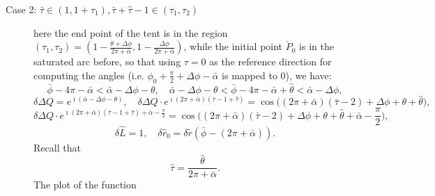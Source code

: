 \documentclass[reqno]{amsart}
\theoremstyle{definition} \newtheorem{definition}{Definition}[section]
\theoremstyle{definition} \newtheorem{remark}[definition]{Remark}
\theoremstyle{plain} \newtheorem{lemma}[definition]{Lemma}
\theoremstyle{plain} \newtheorem{proposition}[definition]{Proposition}
\theoremstyle{plain} \newtheorem{theorem}[definition]{Theorem}
\theoremstyle{plain} \newtheorem{corollary}[definition]{Corollary}
\theoremstyle{definition} \newtheorem{example}[definition]{Example}
\theoremstyle{plain} \newtheorem{claim}[clai]{Claim}
\theoremstyle{definition} \newtheorem{assumption}[definition]{Assumption}
\theoremstyle{definition} \newtheorem{observation}[definition]{Observation}
\newcommand{\1}{\mathbbm 1}
\renewcommand{\i}{\imath}
\numberwithin{equation}{section} %
\theoremstyle{plain} \newtheorem*{theorem*}{Theorem}
\theoremstyle{plain} \newtheorem{mthm}[maintheorem]{Main Theorem}
\theoremstyle{plain} \newtheorem*{mthm*}{Main Theorem}
\theoremstyle{plain} \newtheorem*{conjecture*}{Conjecture}
\theoremstyle{plain} \newtheorem{conjecture}[definition]{Conjecture}
\theoremstyle{plain} \newtheorem*{problem*}{Problem}
\begin{document}
\begin{description}

\item[Case 2: $\bar \tau \in (1,1+\tau_1), \bar \tau + \hat \tau - 1 \in (\tau_1,\tau_2)$] here the end point of the tent is in the region $(\tau_1,\tau_2) = (1 - \frac{\theta + \Delta \phi}{2\pi + \bar \alpha},1 - \frac{\Delta \phi}{2\pi + \bar \alpha})$, while the initial point $\check P_0$ is in the saturated arc before, so that using $\tau = 0$ as the reference direction for computing the angles (i.e. $\phi_0 + \frac{\pi}{2} + \Delta \phi - \bar \alpha$ is mapped to $0$), we have:
\begin{equation*}
\bar \phi - 4 \pi - \bar \alpha < \bar \alpha - \Delta \phi - \theta, \quad \bar \alpha - \Delta \phi - \theta < \bar \phi - 4 \pi - \bar \alpha + \hat \theta < \bar \alpha - \Delta \phi,
\end{equation*}
\begin{equation*}
\delta \Delta Q = e^{\i(\bar \alpha - \Delta \phi - \theta)}, \quad \delta \Delta Q \cdot e^{\i (2\pi + \bar \alpha)(\bar \tau - 1 + \hat \tau)} = \cos \big( (2\pi + \bar \alpha)(\bar\tau - 2) + \Delta \phi + \theta + \hat \theta \big),
\end{equation*}
\begin{equation*}
\delta \Delta Q \cdot e^{\i (2\pi + \bar \alpha)(\bar \tau - 1 + \hat \tau) + \bar \alpha - \frac{\pi}{2}} = \cos \bigg( (2\pi + \bar \alpha)(\bar\tau - 2) + \Delta \phi + \theta + \hat \theta + \bar \alpha - \frac{\pi}{2} \bigg),
\end{equation*}
\begin{equation*}
\delta \hat L = 1, \quad \delta \hat r_0 = \delta \tilde r(\bar \phi - (2\pi + \bar \alpha)).
\end{equation*}
Recall that
\begin{equation*}
\hat \tau = \frac{\hat \theta}{2\pi + \bar \alpha}.
\end{equation*}
The plot of the function

\end{description}
\end{document}
